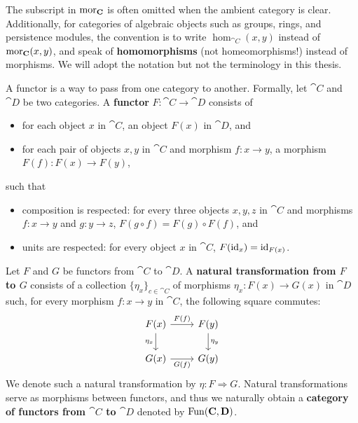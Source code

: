 \begin{notation}
\label{N:hom-vs-mor}
  The subscript in $\operatorname{mor}_{\mathbf{C}}$ is often omitted when the ambient category is clear. Additionally, for categories of algebraic objects such as groups, rings, and persistence modules, the convention is to write $\hom_{\cat{C}}(x, y)$ instead of $\operatorname{mor}_{\mathbf{C}}(x, y)$, and speak of \textbf{homomorphisms} (not homeomorphisms!) instead of morphisms. We will adopt the notation but not the terminology in this thesis.
\end{notation}

\begin{definition}
\label{!D:functor}
  A functor is a way to pass from one category to another. Formally, let $\cat{C}$ and $\cat{D}$ be two categories. A \textbf{functor} $F \colon \cat{C} \to \cat{D}$ consists of
  \begin{itemize}
    \item for each object $x$ in $\cat{C}$, an object $F(x)$ in $\cat{D}$, and
    \item for each pair of objects $x, y$ in $\cat{C}$ and morphism $f \colon x \to y$, a morphism $F(f) \colon F(x) \to F(y)$,
  \end{itemize}
  such that
  \begin{itemize}
    \item composition is respected: for every three objects $x, y, z$ in $\cat{C}$ and morphisms $f \colon x \to y$ and $g \colon y \to z$, $F(g \circ f) = F(g) \circ F(f)$, and
    \item units are respected: for every object $x$ in $\cat{C}$, $F(\operatorname{id}_x) = \operatorname{id}_{F(x)}$.
  \end{itemize}
  Let $F$ and $G$ be functors from $\cat{C}$ to $\cat{D}$. A \textbf{natural transformation from $F$ to $G$} consists of a collection $\{\eta_x\}_{c \in \cat{C}}$ of morphisms $\eta_x \colon F(x) \to G(x)$ in $\cat{D}$ such, for every morphism $f \colon x \to y$ in $\cat{C}$, the following square commutes:
  \[
    \begin{tikzcd}
      F(x)
        \arrow[r, "F(f)"]
        \arrow[d, "\eta_x" swap]
      & F(y)
        \arrow[d, "\eta_y"]
    \\
      G(x)
        \arrow[r, "G(f)" swap]
      & G(y)
    \end{tikzcd}
  \]
  We denote such a natural transformation by $\eta \colon F \Rightarrow G$.
  Natural transformations serve as morphisms between functors, and thus we naturally obtain a \textbf{category of functors from $\cat{C}$ to $\cat{D}$} denoted by $\operatorname{Fun}(\mathbf{C}, \mathbf{D})$.
  

\end{definition}

